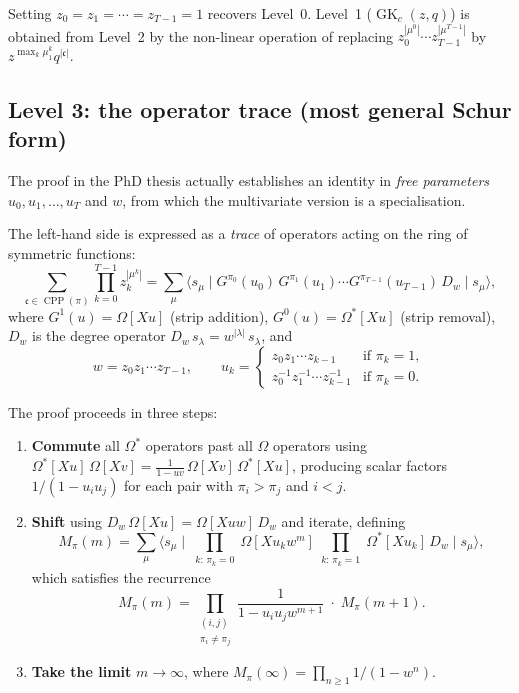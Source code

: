\documentclass[11pt]{article}
\theoremstyle{plain}
\theoremstyle{definition}
\newcommand{\GK}{\operatorname{GK}}
\newcommand{\CPP}{\operatorname{CPP}}
\begin{document}
Setting $z_0 = z_1 = \cdots = z_{T-1} = 1$ recovers Level~0.
Level~1 ($\GK_c(z,q)$) is obtained from Level~2 by the non-linear
operation of replacing
$z_0^{|\mu^0|} \cdots z_{T-1}^{|\mu^{T-1}|}$ by $z^{\max_k \mu^k_1} q^{|\mathfrak{c}|}$.


\subsection{Level 3: the operator trace (most general Schur form)}

The proof in the PhD thesis \cite{Langer-thesis} actually establishes an
identity in \emph{free parameters} $u_0, u_1, \ldots, u_T$ and $w$, from
which the multivariate version is a specialisation.

The left-hand side is expressed as a \emph{trace} of operators acting on the
ring of symmetric functions:
\begin{equation}
  \sum_{\mathfrak{c} \in \CPP(\pi)}
  \prod_{k=0}^{T-1} z_k^{|\mu^k|}
  = \sum_\mu \langle s_\mu \mid
    G^{\pi_0}(u_0)\, G^{\pi_1}(u_1) \cdots G^{\pi_{T-1}}(u_{T-1})\,
    D_w \mid s_\mu \rangle,
  \label{eq:trace-schur}
\end{equation}
where $G^1(u) = \Omega[Xu]$ (strip addition), $G^0(u) = \Omega^*[Xu]$
(strip removal), $D_w$ is the degree operator
$D_w\, s_\lambda = w^{|\lambda|}\, s_\lambda$, and
\begin{equation}
  w = z_0 z_1 \cdots z_{T-1}, \qquad
  u_k = \begin{cases}
    z_0 z_1 \cdots z_{k-1} & \text{if } \pi_k = 1, \\
    z_0^{-1} z_1^{-1} \cdots z_{k-1}^{-1} & \text{if } \pi_k = 0.
  \end{cases}
  \label{eq:uk-specialization}
\end{equation}

The proof proceeds in three steps:
\begin{enumerate}
  \item \textbf{Commute} all $\Omega^*$ operators past all $\Omega$ operators
    using $\Omega^*[Xu]\,\Omega[Xv] = \frac{1}{1-uv}\,\Omega[Xv]\,\Omega^*[Xu]$,
    producing scalar factors $1/(1 - u_i u_j)$ for each pair with
    $\pi_i > \pi_j$ and $i < j$.
  \item \textbf{Shift} using $D_w\,\Omega[Xu] = \Omega[Xuw]\,D_w$ and iterate,
    defining
    \begin{equation}
      M_\pi(m) = \sum_\mu \langle s_\mu \mid
      \prod_{\substack{k:\,\pi_k=0}} \Omega[Xu_k w^m]
      \prod_{\substack{k:\,\pi_k=1}} \Omega^*[Xu_k]\,
      D_w \mid s_\mu \rangle,
      \label{eq:M-def}
    \end{equation}
    which satisfies the recurrence
    \begin{equation}
      M_\pi(m) = \prod_{\substack{(i,j)\\\pi_i \neq \pi_j}}
      \frac{1}{1 - u_i u_j w^{m+1}} \;\cdot\; M_\pi(m+1).
      \label{eq:M-recurrence}
    \end{equation}
  \item \textbf{Take the limit} $m \to \infty$, where
    $M_\pi(\infty) = \prod_{n \geq 1} 1/(1-w^n)$.
\end{enumerate}
\end{document}
